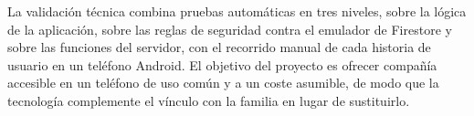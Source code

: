 La validación técnica combina pruebas automáticas en tres niveles, sobre la lógica de la aplicación, sobre las reglas de seguridad contra el emulador de Firestore y sobre las funciones del servidor, con el recorrido manual de cada historia de usuario en un teléfono Android. El objetivo del proyecto es ofrecer compañía accesible en un teléfono de uso común y a un coste asumible, de modo que la tecnología complemente el vínculo con la familia en lugar de sustituirlo.

\vspace{0.4cm}
\par\vspace{\baselineskip}

\chapter*{}

\thispagestyle{empty}

\begin{center}
{\large\bfseries \thetitleen}\\
\end{center}
\begin{center}
\theauthor\\
\end{center}

